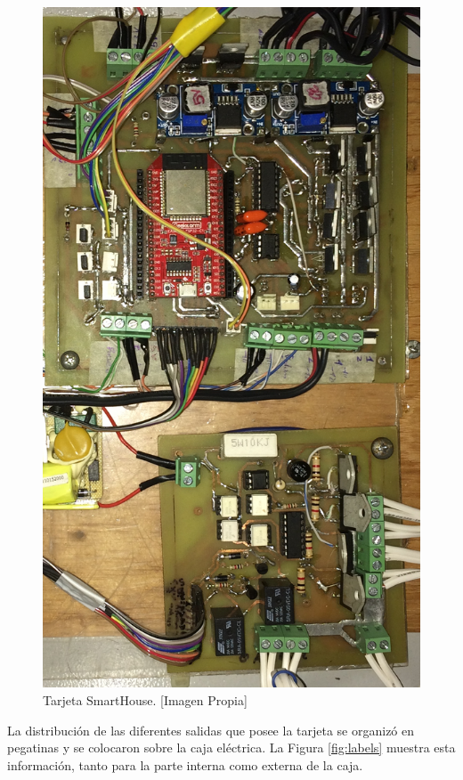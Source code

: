 \begin{figure}[!t]
	\centering
	\caption[Tarjeta SmartHouse.]{Tarjeta SmartHouse. [Imagen Propia]}
	\label{fig:tarjeta}
	\includegraphics[width=0.6\linewidth]{Imagenes/Tarjeta.jpg}
\end{figure}

La distribución de las diferentes salidas que posee la tarjeta se organizó en pegatinas y se colocaron sobre la caja eléctrica. La Figura \ref{fig:labels} muestra esta información, tanto para la parte interna como externa de la caja.\\

